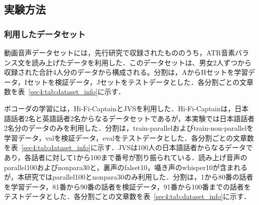 \subsection{実験方法}
\subsubsection{利用したデータセット}
動画音声データセットには，先行研究\cite{taguchi,esaki}で収録されたもののうち，ATR音素バランス文\cite{atr}を読み上げたデータを利用した．このデータセットは、男女2人ずつから収録された合計4人分のデータから構成される。分割は，AからHセットを学習データ，Iセットを検証データ，Jセットをテストデータとした．各分割ごとの文章数を表~\ref{sec4:tab:dataset_info}に示す．

ボコーダの学習には，Hi-Fi-Captain\cite{okamoto2023hi}とJVS\cite{takamichi2019jvs}を利用した．Hi-Fi-Captainは，日本語話者2名と英語話者2名からなるデータセットであるが，本実験では日本語話者2名分のデータのみを利用した．分割は，train-parallelおよびtrain-non-parallelを学習データ，valを検証データ，evalをテストデータとした．各分割ごとの文章数を表~\ref{sec4:tab:dataset_info}に示す．JVSは100人の日本語話者からなるデータであり，各話者に対して1から100まで番号が割り振られている．読み上げ音声のparallel100およびnonpara30と，裏声のfalset10，囁き声のwhisper10が含まれるが，本研究ではparallel100とnonpara30のみ利用した．分割は，1から80番の話者を学習データ，81番から90番の話者を検証データ，91番から100番までの話者をテストデータとした．各分割ごとの文章数を表~\ref{sec4:tab:dataset_info}に示す．

\begin{table*}[bt]
    \centering
    \caption{利用したデータセットの文章数}
    \label{sec4:tab:dataset_info}
    \begin{center}
        \renewcommand{\arraystretch}{0.9} %
        \setlength{\tabcolsep}{8pt}      %
    \end{center}
\end{table*}

